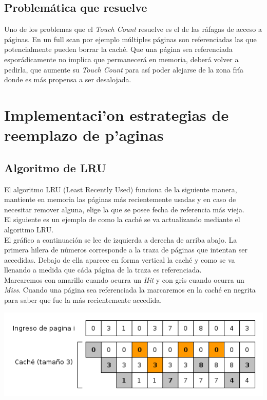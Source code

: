 \documentclass[11pt, a4paper, spanish]{article}
\begin{document}
\subsection{Problem\'atica que resuelve}

Uno de los problemas que el \textit{Touch Count} resuelve es el de las r\'afagas de acceso a p\'aginas. En un full scan por ejemplo m\'ultiples p\'aginas
son referenciadas las que potencialmente pueden borrar la cach\'e. Que una p\'agina sea referenciada espor\'adicamente no implica que permanecer\'a en memoria, deber\'a volver a pedirla, que aumente su \textit{Touch Count} para as\'i poder alejarse de la zona fr\'ia donde es m\'as propensa a ser desalojada.

\newpage 
\section{Implementaci'on estrategias de reemplazo de p'aginas}

\subsection{Algoritmo de LRU}

El algoritmo LRU (Least Recently Used) funciona de la siguiente manera, mantiente en memoria las p\'aginas m\'as recientemente usadas
y en caso de necesitar remover alguna, elige la que se posee fecha de referencia m\'as vieja.\\

El siguiente es un ejemplo de como la cach\'e se va actualizando mediante el algoritmo LRU.\\

El gr\'afico a continuaci\'on se lee de izquierda a derecha de arriba abajo. La primera hilera de n\'umeros corresponde a la traza de p\'aginas que intentan ser 
accedidas. Debajo de ella aparece en forma vertical la cach\'e y como se va llenando a medida que c\'ada p\'agina de la traza es referenciada.\\ 

Marcaremos con amarillo cuando ocurra un \textit{Hit} y con gris cuando ocurra un \textit{Miss}.
Cuando una p\'agina sea referenciada la marcaremos en la cach\'e en negrita para saber que fue la m\'as recientemente accedida.\\

\begin{center}
		\includegraphics[scale=0.65]{diagramas/LRUAlgorithm.png}\\
\end{center}
\end{document}
